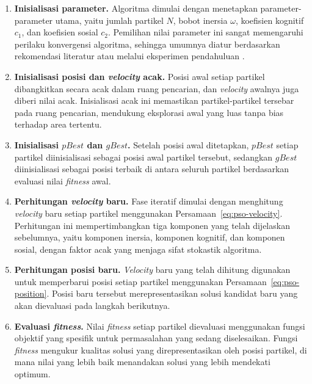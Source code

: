 \begin{enumerate}
	\item \textbf{Inisialisasi parameter.} Algoritma dimulai dengan menetapkan parameter-parameter utama, yaitu jumlah partikel $N$, bobot inersia $\omega$, koefisien kognitif $c_1$, dan koefisien sosial $c_2$. Pemilihan nilai parameter ini sangat memengaruhi perilaku konvergensi algoritma, sehingga umumnya diatur berdasarkan rekomendasi literatur atau melalui eksperimen pendahuluan \cite{kennedy1995particle}.
	
	\item \textbf{Inisialisasi posisi dan \textit{velocity} acak.} Posisi awal setiap partikel dibangkitkan secara acak dalam ruang pencarian, dan \textit{velocity} awalnya juga diberi nilai acak. Inisialisasi acak ini memastikan partikel-partikel tersebar pada ruang pencarian, mendukung eksplorasi awal yang luas tanpa bias terhadap area tertentu.
	
	\item \textbf{Inisialisasi $pBest$ dan $gBest$.} Setelah posisi awal ditetapkan, $pBest$ setiap partikel diinisialisasi sebagai posisi awal partikel tersebut, sedangkan $gBest$ diinisialisasi sebagai posisi terbaik di antara seluruh partikel berdasarkan evaluasi nilai \textit{fitness} awal.
	
	\item \textbf{Perhitungan \textit{velocity} baru.} Fase iteratif dimulai dengan menghitung \textit{velocity} baru setiap partikel menggunakan Persamaan~\ref{eq:pso-velocity}. Perhitungan ini mempertimbangkan tiga komponen yang telah dijelaskan sebelumnya, yaitu komponen inersia, komponen kognitif, dan komponen sosial, dengan faktor acak yang menjaga sifat stokastik algoritma.
	
	\item \textbf{Perhitungan posisi baru.} \textit{Velocity} baru yang telah dihitung digunakan untuk memperbarui posisi setiap partikel menggunakan Persamaan~\ref{eq:pso-position}. Posisi baru tersebut merepresentasikan solusi kandidat baru yang akan dievaluasi pada langkah berikutnya.
	
	\item \textbf{Evaluasi \textit{fitness}.} Nilai \textit{fitness} setiap partikel dievaluasi menggunakan fungsi objektif yang spesifik untuk permasalahan yang sedang diselesaikan. Fungsi \textit{fitness} mengukur kualitas solusi yang direpresentasikan oleh posisi partikel, di mana nilai yang lebih baik menandakan solusi yang lebih mendekati optimum.
	

\end{enumerate}
